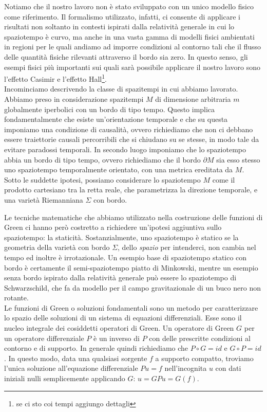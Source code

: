 \documentclass[11pt,a4paper]{article}
\begin{document}
	Notiamo che il nostro lavoro non è stato sviluppato con un unico modello fisico come riferimento. Il formalismo utilizzato, infatti, ci consente di applicare i risultati non soltanto in contesti ispirati dalla relatività generale in cui lo spaziotempo è curvo, ma anche in una vasta gamma di modelli fisici ambientati in regioni per le quali andiamo ad imporre condizioni al contorno tali che il flusso delle quantità fisiche rilevanti attraverso il bordo sia zero. In questo senso, gli esempi fisici più importanti sui quali sarà possibile applicare il nostro lavoro sono l'effetto Casimir e l'effetto Hall\footnote{se ci sto coi tempi aggiungo dettagli}.\\
	
	Incominciamo descrivendo la classe di spazitempi in cui abbiamo lavorato. Abbiamo preso in considerazione spazitempi $M$ di dimensione arbitraria $m$ globalmente iperbolici con un bordo di tipo tempo. Questo implica fondamentalmente che esiste un'orientazione temporale e che su questa imponiamo una condizione di causalità, ovvero richiediamo che non ci debbano essere traiettorie causali percorribili che si chiudano su se stesse, in modo tale da evitare paradossi temporali. In secondo luogo imponiamo che lo spaziotempo abbia un bordo di tipo tempo, ovvero richiediamo che il bordo $\partial M$ sia esso stesso uno spaziotempo temporalmente orientato, con una metrica ereditata da $M$. Sotto le suddette ipotesi, possiamo considerare lo spaziotempo $M$ come il prodotto cartesiano tra la retta reale, che parametrizza la direzione temporale, e una varietà Riemanniana $\Sigma$ con bordo.
	
	Le tecniche matematiche che abbiamo utilizzato nella costruzione delle funzioni di Green ci hanno però costretto a richiedere un'ipotesi aggiuntiva sullo spaziotempo: la staticità. Sostanzialmente, uno spaziotempo è statico se la geometria della varietà con bordo $\Sigma$, dello \emph{spazio} per intenderci, non cambia nel tempo ed inoltre è irrotazionale. Un esempio base di spaziotempo statico con bordo è certamente il semi-spaziotempo piatto di Minkowski, mentre un esempio senza bordo ispirato dalla relatività generale può essere lo spaziotempo di Schwarzschild, che fa da modello per il campo gravitazionale di un buco nero non rotante.\\
	
	Le funzioni di Green o soluzioni fondamentali sono un metodo per caratterizzare lo spazio delle soluzioni di un sistema di equazioni differenziali. Esse sono il nucleo integrale dei cosiddetti operatori di Green. Un operatore di Green $G$ per un operatore differenziale $P$ è un inverso di $P$ con delle prescritte condizioni al contorno e di supporto. In generale quindi richiediamo che $P\circ G=id$ e $G\circ P=id$. In questo modo, data una qualsiasi sorgente $f$ a supporto compatto, troviamo l'unica soluzione all'equazione differenziale $Pu=f$ nell'incognita $u$ con dati iniziali nulli semplicemente applicando $G$: $u=GPu=G(f)$.
		
\end{document}
